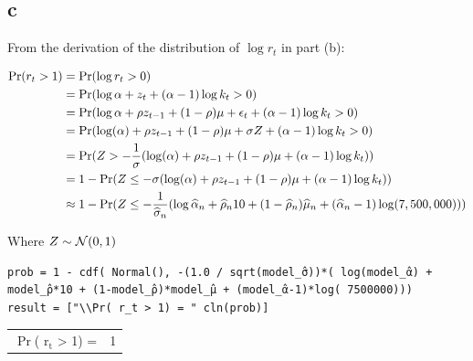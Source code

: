 \documentclass[12pt, letterpaper]{paper}
\begin{document}
\subsection{c}
\label{sec:org83a11f9}
From the derivation of the distribution of $\log r_t$ in part (b):

\begin{align*}
    \Pr( r_t > 1) &= \Pr( \log r_t > 0)\\
                  &= \Pr( \log \alpha + z_t + (\alpha - 1)\log k_t > 0)\\
                  &= \Pr( \log \alpha + \rho z_{t-1} + (1 - \rho)\mu + \epsilon_t + (\alpha-1) \log k_t > 0)\\
    &= \Pr( \log(\alpha) + \rho z_{t-1} + (1-\rho)\mu + \sigma Z + (\alpha-1) \log k_t
      > 0)\\
                  &= \Pr( Z > - \frac{1}{\sigma} ( \log(\alpha) + \rho z_{t-1} + (1-\rho)\mu + (\alpha-1)\log k_t))\\
    &= 1 - \Pr( Z \leq - \sigma ( \log(\alpha) + \rho z_{t-1} + (1-\rho)\mu + (\alpha-1)\log
      k_t))\\
    &\approx 1 - \Pr( Z \leq  -\frac{1}{\widehat{ \sigma }_{n}} ( \log \widehat{ \alpha }_{n} + \widehat{ \rho }_{n}10 + (1-\widehat{ \rho }_{n})
      \widehat{ \mu }_{n} + (\widehat{ \alpha }_{n} - 1) \log( 7,500,000) ))\\
\end{align*}

Where $Z \sim \mathcal{N}(0,1)$

\begin{verbatim}
prob = 1 - cdf( Normal(), -(1.0 / sqrt(model_̂σ))*( log(model_̂α) + model_̂ρ*10 + (1-model_̂ρ)*model_̂μ + (model_̂α-1)*log( 7500000)))
result = ["\\Pr( r_t > 1) = " cln(prob)]
\end{verbatim}

\begin{center}
\begin{tabular}{lr}
\(\Pr\)( r\(_{\text{t}}\) > 1) = & 1\\
\end{tabular}
\end{center}
\end{document}
